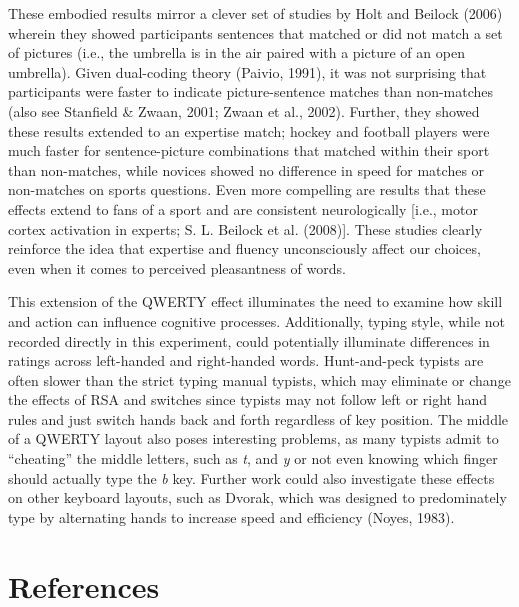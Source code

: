 \documentclass[
  english,
  man]{apa7}
\begin{document}
These embodied results mirror a clever set of studies by Holt and Beilock (2006) wherein they showed participants sentences that matched or did not match a set of pictures (i.e., the umbrella is in the air paired with a picture of an open umbrella). Given dual-coding theory (Paivio, 1991), it was not surprising that participants were faster to indicate picture-sentence matches than non-matches (also see Stanfield \& Zwaan, 2001; Zwaan et al., 2002). Further, they showed these results extended to an expertise match; hockey and football players were much faster for sentence-picture combinations that matched within their sport than non-matches, while novices showed no difference in speed for matches or non-matches on sports questions. Even more compelling are results that these effects extend to fans of a sport and are consistent neurologically {[}i.e., motor cortex activation in experts; S. L. Beilock et al. (2008){]}. These studies clearly reinforce the idea that expertise and fluency unconsciously affect our choices, even when it comes to perceived pleasantness of words.

This extension of the QWERTY effect illuminates the need to examine how skill and action can influence cognitive processes. Additionally, typing style, while not recorded directly in this experiment, could potentially illuminate differences in ratings across left-handed and right-handed words. Hunt-and-peck typists are often slower than the strict typing manual typists, which may eliminate or change the effects of RSA and switches since typists may not follow left or right hand rules and just switch hands back and forth regardless of key position. The middle of a QWERTY layout also poses interesting problems, as many typists admit to ``cheating'' the middle letters, such as \emph{t}, and \emph{y} or not even knowing which finger should actually type the \emph{b} key. Further work could also investigate these effects on other keyboard layouts, such as Dvorak, which was designed to predominately type by alternating hands to increase speed and efficiency (Noyes, 1983).

\newpage

\hypertarget{references}{%
\section{References}\label{references}}

\setlength{\parindent}{-0.5in}
\setlength{\leftskip}{0.5in}
\end{document}

